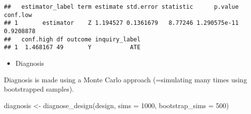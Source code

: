 \documentclass[
]{book}
\newenvironment{Shaded}{\begin{snugshade}}{\end{snugshade}}
\newcommand{\AttributeTok}[1]{\textcolor[rgb]{0.77,0.63,0.00}{#1}}
\newcommand{\DecValTok}[1]{\textcolor[rgb]{0.00,0.00,0.81}{#1}}
\newcommand{\FunctionTok}[1]{\textcolor[rgb]{0.00,0.00,0.00}{#1}}
\newcommand{\NormalTok}[1]{#1}
\newcommand{\OtherTok}[1]{\textcolor[rgb]{0.56,0.35,0.01}{#1}}
\providecommand{\tightlist}{%
  \setlength{\itemsep}{0pt}\setlength{\parskip}{0pt}}
\begin{document}
\begin{verbatim}
##   estimator_label term estimate std.error statistic      p.value  conf.low
## 1       estimator    Z 1.194527 0.1361679   8.77246 1.290575e-11 0.9208878
##   conf.high df outcome inquiry_label
## 1  1.468167 49       Y           ATE
\end{verbatim}

\begin{itemize}
\tightlist
\item
  Diagnosis
\end{itemize}

Diagnosis is made using a Monte Carlo approach (=simulating many times using bootstrapped samples).

\begin{Shaded}
\begin{Highlighting}[]
\NormalTok{diagnosis }\OtherTok{\textless{}{-}} \FunctionTok{diagnose\_design}\NormalTok{(design, }
                             \AttributeTok{sims =} \DecValTok{1000}\NormalTok{, }
                             \AttributeTok{bootstrap\_sims =} \DecValTok{500}\NormalTok{)}
\end{Highlighting}
\end{Shaded}
\end{document}
